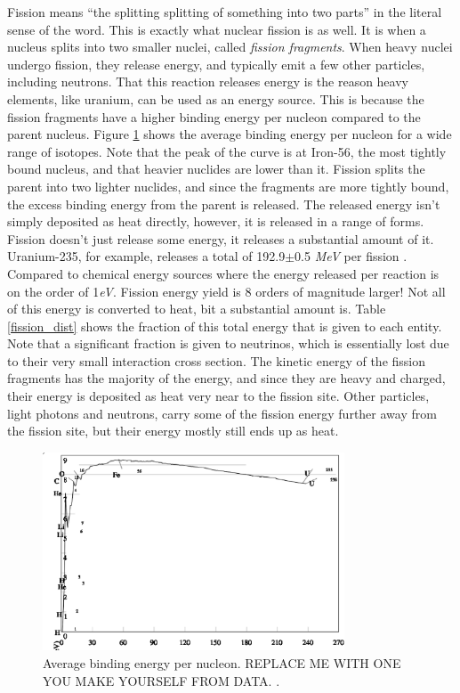 Fission means ``the splitting splitting of something into two parts'' in the literal sense of the word.  This is exactly what nuclear fission is as well.  It is when a nucleus splits into two smaller nuclei, called \emph{fission fragments}.  When heavy nuclei undergo fission, they release energy, and typically emit a few other particles, including neutrons.  That this reaction releases energy is the reason heavy elements, like uranium, can be used as an energy source.  This is because the fission fragments have a higher binding energy per nucleon compared to the parent nucleus.  Figure \ref{binding_e_per_nuc} shows the average binding energy per nucleon for a wide range of isotopes.  Note that the peak of the curve is at Iron-56, the most tightly bound nucleus, and that heavier nuclides are lower than it.  Fission splits the parent into two lighter nuclides, and since the fragments are more tightly bound, the excess binding energy from the parent is released.  The released energy isn't simply deposited as heat directly, however, it is released in a range of forms.  Fission doesn't just release some energy, it releases a substantial amount of it.  Uranium-235, for example, releases a total of 192.9$\pm$0.5 \emph{MeV} per fission \cite{duderstadt}.  Compared to chemical energy sources where the energy released per reaction is on the order of 1\emph{eV}.  Fission energy yield is 8 orders of magnitude larger!  Not all of this energy is converted to heat, bit a substantial amount is.  Table \ref{fission_dist} shows the fraction of this total energy that is given to each entity.  Note that a significant fraction is given to neutrinos, which is essentially lost due to their very small interaction cross section.  The kinetic energy of the fission fragments has the majority of the energy, and since they are heavy and charged, their energy is deposited as heat very near to the fission site.  Other particles, light photons and neutrons, carry some of the fission energy further away from the fission site, but their energy mostly still ends up as heat.
  
\begin{figure}[h!]
\label{binding_e_per_nuc}
  \centering
    \includegraphics[width=0.8\textwidth]{graphics/binding_e_per_nuc.eps}
     \caption{Average binding energy per nucleon.  REPLACE ME WITH ONE YOU MAKE YOURSELF FROM DATA. \cite{}.}
\end{figure}

